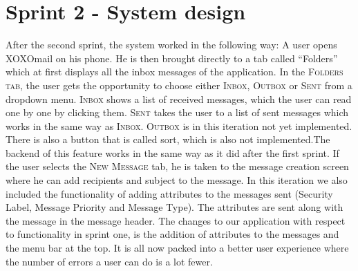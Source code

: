 \section{Sprint 2 - System design}
After the second sprint, the system worked in the following way: A user opens XOXOmail on his phone. He is then brought directly to a tab called “Folders” which at first displays all the inbox messages of the application.
\newline
\newline
In the \textsc{Folders tab}, the user gets the opportunity to choose either  \textsc{Inbox},  \textsc{Outbox} or  \textsc{Sent} from a dropdown menu.  \textsc{Inbox} shows a list of received messages, which the user can read one by one by clicking them. \textsc{Sent} takes the user to a list of sent messages which works in the same way as \textsc{Inbox}. \textsc{Outbox} is in this iteration not yet implemented. There is also a button that is called sort, which is also not implemented.The backend of this feature works in the same way as it did after the first sprint. 
\newline
\newline
If the user selects the \textsc{New Message} tab, he is taken to the message creation screen where he can add recipients and subject to the message. In this iteration we also included the functionality of adding attributes to the messages sent (Security Label, Message Priority and Message Type). The attributes are sent along with the message in the message header.
\newline
\newline
The changes to our application with respect to functionality in sprint one, is the addition of attributes to the messages and the menu bar at the top. It is all now packed into a better user experience where the number of errors a user can do is a lot fewer. 
